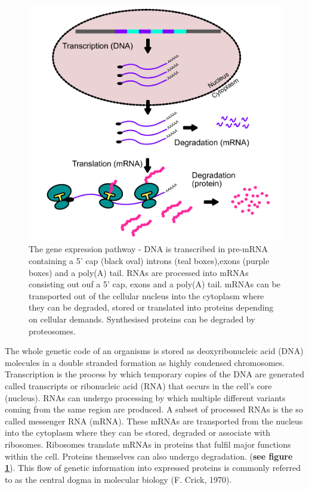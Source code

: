\documentclass[12pt,openany]{book}
\begin{document}
\begin{figure}
  \includegraphics{./figures/geneExprPath_2.pdf}
  \caption{The gene expression pathway - DNA is transcribed in pre-mRNA containing a 5' cap (black oval) introns (teal boxes),exons (purple boxes) and a poly(A) tail. RNAs are processed into mRNAs consisting out ouf a 5' cap, exons and a poly(A) tail. mRNAs can be transported out of the cellular nucleus into the cytoplasm where they can be degraded, stored or translated into proteins depending on cellular demands. Synthesised proteins can be degraded by proteosomes. \label{fig:geneExprPath}}
\end{figure}

The whole genetic code of an organisms is stored as deoxyribonucleic
acid (DNA) molecules in a double stranded formation as highly condensed
chromosomes. Transcription is the process by which temporary copies of
the DNA are generated called transcripts or ribonucleic acid (RNA) that
occurs in the cell's core (nucleus). RNAs can undergo processing by
which multiple different variants coming from the same region are
produced. A subset of processed RNAs is the so called messenger RNA
(mRNA). These mRNAs are transported from the nucleus into the cytoplasm
where they can be stored, degraded or associate with ribosomes.
Ribosomes translate mRNAs in proteins that fulfil major functions within
the cell. Proteins themselves can also undergo degradation. (\textbf{see
figure \ref{fig:geneExprPath}}). This flow of genetic information into
expressed proteins is commonly referred to as the central dogma in
molecular biology (F. Crick, 1970). \clearpage
\end{document}
